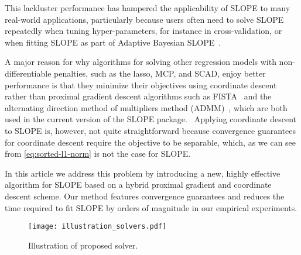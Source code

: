 This lackluster performance has hampered the applicability of SLOPE to many
real-world applications,  particularly because users often need to solve SLOPE
repeatedly when tuning hyper-parameters, for instance in
cross-validation, or when fitting SLOPE as part of Adaptive Bayesian
SLOPE~\cite{jiang2022}.

A major reason for why algorithms for solving other regression models with
non-differentiable penalties, such as the lasso, MCP, and SCAD, enjoy better
performance is that they minimize their objectives using coordinate
descent~\cite{breheny2011, friedman2010} rather than proximal gradient descent
algorithms such as FISTA~\cite{beck2009} and the
alternating direction method of multipliers method (ADMM)~\cite{boyd2010},
which are both used in the current version of the SLOPE package.
\
Applying coordinate descent to SLOPE is, however, not quite straightforward
because convergence guarantees for coordinate descent require the
objective to be separable, which, as we can see from \eqref{eq:sorted-l1-norm}
is not the case for SLOPE.


In this article we address this problem by introducing a new, highly effective
algorithm for SLOPE based on a hybrid proximal gradient and coordinate descent
scheme. Our method features convergence guarantees and reduces the time
required to fit SLOPE by orders of magnitude in our empirical experiments.

\begin{figure}[htbp]
  \centering
  \texttt{[image: illustration\_solvers.pdf]}
  \caption{Illustration of proposed solver. }
  \label{fig:illustration-solver}
\end{figure}
